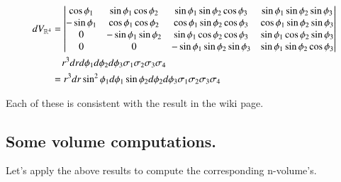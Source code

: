\documentclass{article}
\begin{document}
\begin{align*}
dV_{\Rm{4}} &=
\begin{vmatrix}
\cos\phi_1 & \sin\phi_1 \cos\phi_2 & \sin\phi_1 \sin\phi_2 \cos\phi_3 & \sin\phi_1 \sin\phi_2 \sin\phi_3  \\
-\sin\phi_1 & \cos\phi_1 \cos\phi_2 & \cos\phi_1 \sin\phi_2 \cos\phi_3 & \cos\phi_1 \sin\phi_2 \sin\phi_3  \\
         0 & -\sin\phi_1 \sin\phi_2 & \sin\phi_1 \cos\phi_2 \cos\phi_3 & \sin\phi_1 \cos\phi_2 \sin\phi_3  \\
         0 &                     0 & -\sin\phi_1 \sin\phi_2 \sin\phi_3 & \sin\phi_1 \sin\phi_2 \cos\phi_3  \\
\end{vmatrix} \\
&\quad r^3 dr d\phi_1 d\phi_2 d\phi_3 \sigma_1 \sigma_2 \sigma_3 \sigma_4 \\
&=
%
%
%
%
%
%
%
%
r^3 dr \sin^2\phi_1 d\phi_1 \sin\phi_2 d\phi_2 d\phi_3 \sigma_1 \sigma_2 \sigma_3 \sigma_4 \\
\end{align*}

Each of these is consistent with the result in the wiki page.

\subsection{ Some volume computations. }

Let's apply the above results to compute the corresponding n-volume's.
\end{document}
